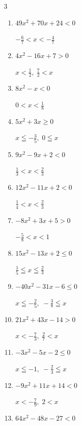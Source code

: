 \begin{multicols}{3}
\begin{enumerate}
  \item $49x^{2}+70x+24<0$

        $\displaystyle -\frac{6}{7} < x < -\frac{4}{7}$

  \item $4x^{2}-16x+7>0$

        $\displaystyle x < \frac{1}{2} , \; \frac{7}{2} < x$

  \item $8x^{2}-x<0$

        $\displaystyle 0 < x < \frac{1}{8}$

  \item $5x^{2}+3x\geq 0$

        $\displaystyle x \leqq -\frac{3}{5} , \; 0 \leqq x$

  \item $9x^{2}-9x+2<0$

        $\displaystyle \frac{1}{3} < x < \frac{2}{3}$

  \item $12x^{2}-11x+2<0$

        $\displaystyle \frac{1}{4} < x < \frac{2}{3}$

  \item $-8x^{2}+3x+5>0$

        $\displaystyle -\frac{5}{8} < x < 1$

  \item $15x^{2}-13x+2\leq 0$

        $\displaystyle \frac{1}{5} \leqq x \leqq \frac{2}{3}$

\columnbreak %

  \item $-40x^{2}-31x-6\leq 0$

        $\displaystyle x \leqq -\frac{2}{5} , \; -\frac{3}{8} \leqq x$

  \item $21x^{2}+43x-14>0$

        $\displaystyle x < -\frac{7}{3} , \; \frac{2}{7} < x$

  \item $-3x^{2}-5x-2\leq 0$

        $\displaystyle x \leqq -1 , \; -\frac{2}{3} \leqq x$

  \item $-9x^{2}+11x+14<0$

        $\displaystyle x < -\frac{7}{9} , \; 2 < x$

  \item $64x^{2}-48x-27<0$


\end{enumerate}
\end{multicols}
